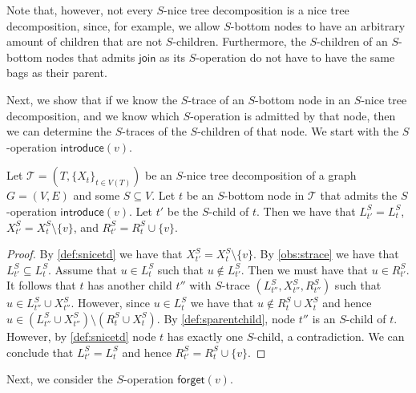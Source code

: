 \documentclass[a4paper,UKenglish,cleveref, autoref, thm-restate, numberwithinsect]{lipics-v2021}
\newcommand{\introduce}{\mathsf{introduce}}
\newcommand{\forget}{\mathsf{forget}}
\newcommand{\join}{\mathsf{join}}
\begin{document}
Note that, however, not every $S$-nice tree decomposition is a nice tree decomposition, since, for example, we allow $S$-bottom nodes to have an arbitrary amount of children that are not $S$-children. Furthermore, the $S$-children of an $S$-bottom nodes that admits $\join$ as its $S$-operation do not have to have the same bags as their parent.

Next, we show that if we know the $S$-trace of an $S$-bottom node in an $S$-nice tree decomposition, and we know which $S$-operation is admitted by that node, then we can determine the $S$-traces of the $S$-children of that node. We start with the $S$-operation $\introduce(v)$.

\begin{observation}\label{obs:introduce}
    Let $\mathcal{T}=(T,\{X_t\}_{t\in V(T)})$ be an $S$-nice tree decomposition of a graph $G=(V,E)$ and some $S\subseteq V$. Let $t$ be an $S$-bottom node in $\mathcal{T}$ that admits the $S$-operation $\introduce(v)$. Let $t'$ be the $S$-child of $t$.
    Then we have that $L_{t'}^S= L_{t}^S$, $X_{t'}^S= X_{t}^S\setminus \{v\}$, and $R_{t'}^S=R_{t}^S\cup \{v\}$.
\end{observation}
\begin{proof}
    By \cref{def:snicetd} we have that $X_{t'}^S= X_{t}^S\setminus \{v\}$. By \cref{obs:strace} we have that $L_{t'}^S\subseteq L_{t}^S$. Assume that $u\in L_{t}^S$ such that $u\notin L_{t'}^S$. Then we must have that $u\in R_{t'}^S$. It follows that $t$ has another child $t''$ with $S$-trace $(L_{t''}^S, X_{t''}^S, R_{t''}^S)$ such that $u\in L_{t''}^S \cup X_{t''}^S$. However, since $u\in L_{t}^S$ we have that $u\notin R_{t}^S\cup X_{t}^S$ and hence $u\in (L_{t''}^S \cup X_{t''}^S)\setminus (R_{t}^S\cup X_{t}^S)$. By \cref{def:sparentchild}, node $t''$ is an $S$-child of $t$. However, by \cref{def:snicetd} node $t$ has exactly one $S$-child, a contradiction. We can conclude that $L_{t'}^S=L_{t}^S$ and hence $R_{t'}^S=R_{t}^S\cup \{v\}$. 
\end{proof}
Next, we consider the $S$-operation $\forget(v)$.
\end{document}
